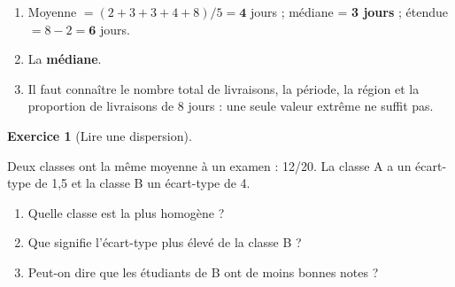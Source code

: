 \documentclass[
  french,
  letterpaper,
  open=any]{scrbook}
\providecommand{\tightlist}{%
  \setlength{\itemsep}{0pt}\setlength{\parskip}{0pt}}
\theoremstyle{definition}
\theoremstyle{definition}
\newtheorem{exercise}{Exercice}[section]
\theoremstyle{remark}
\begin{document}
\begin{tcolorbox}[enhanced jigsaw, arc=.35mm, bottomrule=.15mm, bottomtitle=1mm, breakable, colback=white, colbacktitle=quarto-callout-tip-color!10!white, colframe=quarto-callout-tip-color-frame, coltitle=black, left=2mm, leftrule=.75mm, opacityback=0, opacitybacktitle=0.6, rightrule=.15mm, title=\textcolor{quarto-callout-tip-color}{\faLightbulb}\hspace{0.5em}{Solution de l'exercice Exercice~\ref{exr-eda-4}}, titlerule=0mm, toprule=.15mm, toptitle=1mm]

\begin{enumerate}
\def\labelenumi{\alph{enumi}.}
\tightlist
\item
  Moyenne \(=(2+3+3+4+8)/5=\textbf{4}\) jours ; médiane = \textbf{3
  jours} ; étendue \(=8-2=\textbf{6}\) jours.
\item
  La \textbf{médiane}.
\item
  Il faut connaître le nombre total de livraisons, la période, la région
  et la proportion de livraisons de 8 jours : une seule valeur extrême
  ne suffit pas.
\end{enumerate}

\end{tcolorbox}

\begin{exercise}[Lire une
dispersion]\protect\hypertarget{exr-eda-5}{}\label{exr-eda-5}

Deux classes ont la même moyenne à un examen : 12/20. La classe A a un
écart-type de 1,5 et la classe B un écart-type de 4.

\begin{enumerate}
\def\labelenumi{\alph{enumi}.}
\tightlist
\item
  Quelle classe est la plus homogène ?
\item
  Que signifie l'écart-type plus élevé de la classe B ?
\item
  Peut-on dire que les étudiants de B ont de moins bonnes notes ?
\end{enumerate}

\end{exercise}
\end{document}
